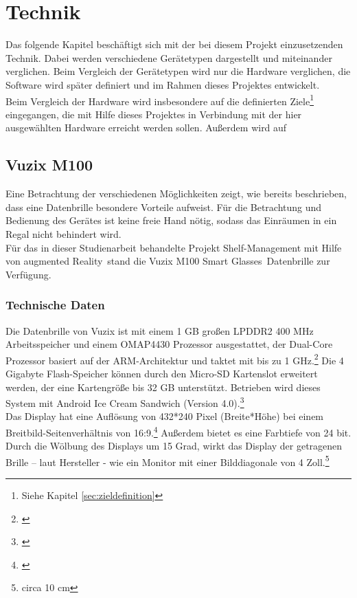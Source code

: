 \chapter{Technik}
\label{cha:technik}
Das folgende Kapitel beschäftigt sich mit der bei diesem Projekt einzusetzenden Technik. Dabei werden verschiedene Gerätetypen dargestellt und miteinander verglichen. Beim Vergleich der Gerätetypen wird nur die Hardware verglichen, die Software wird später definiert und im Rahmen dieses Projektes entwickelt.\\

Beim Vergleich der Hardware wird insbesondere auf die definierten Ziele\footnote{Siehe Kapitel \ref{sec:zieldefinition} } eingegangen, die mit Hilfe dieses Projektes in Verbindung mit der hier ausgewählten Hardware erreicht werden sollen. Außerdem wird auf

\section{Vuzix M100}
\label{sec:vuzix}
Eine Betrachtung der verschiedenen Möglichkeiten zeigt, wie bereits beschrieben, dass eine Datenbrille besondere Vorteile aufweist. Für die Betrachtung und Bedienung des Gerätes ist keine freie Hand nötig, sodass das Einräumen in ein Regal nicht behindert wird.\\

Für das in dieser Studienarbeit behandelte Projekt \glqq Shelf-Management mit Hilfe von augmented Reality\grqq\ stand die \glqq Vuzix M100 Smart Glasses\grqq\ Datenbrille zur Verfügung.

\subsection{Technische Daten}
Die Datenbrille von Vuzix ist mit einem 1 GB großen LPDDR2 400 MHz Arbeitsspeicher und einem OMAP4430 Prozessor ausgestattet, der Dual-Core Prozessor basiert auf der ARM-Architektur und taktet mit bis zu 1 GHz.\footnote{\citep{omap4430}} Die 4 Gigabyte Flash-Speicher können durch den Micro-SD Kartenslot erweitert werden, der eine Kartengröße bis 32 GB unterstützt. Betrieben wird dieses System mit Android Ice Cream Sandwich (Version 4.0).\footnote{\citep{vuzixm100}}\\

Das Display hat eine Auflösung von 432*240 Pixel (Breite*Höhe) bei einem Breitbild-Seitenverhältnis von 16:9.\footnote{\citep{wqvga}} Außerdem bietet es eine Farbtiefe von 24 bit. Durch die Wölbung des Displays um 15 Grad, wirkt das Display der getragenen Brille – laut Hersteller - wie ein Monitor mit einer Bilddiagonale von 4 Zoll.\footnote{circa 10 cm}\\


